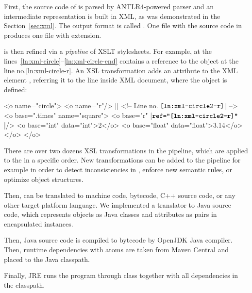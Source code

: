 First, the source code of \eo{} is parsed by ANTLR4-powered
parser and an intermediate representation is built in XML,
as was demonstrated in the Section~\ref{sec:xml}.
The output format is called \XMIR{}.
One  file with
the source code in \eo{} produces one \XMIR{} file with  extension.

\XMIR{} is then refined via a \emph{pipeline} of XSLT stylesheets.
For example, \XMIR{} at the
lines~\ref{ln:xml-circle}--\ref{ln:xml-circle-end} contains a
reference to the object  at the line no.\ref{ln:xml-circle-r}.
An XSL transformation adds an attribute  to the XML element ,
referring it to the line inside XML document, where the object  is defined:

\begin{ffcode}
<o name="circle">
  <o name="r"/> |$\label{ln:xml-circle2-r}$| <!-- Line no.|$\texttt{\ref{ln:xml-circle2-r}}$| -->
  <o base=".times" name="square">
    <o base="r" |$\textbf{\texttt{ref="\ref{ln:xml-circle2-r}"}}$|/>
    <o base="int" data="int">2</o>
    <o base="float" data="float">3.14</o>
  </o>
</o>
\end{ffcode}

There are over two dozens XSL transformations in the pipeline, which
are applied to the \XMIR{} in a specific order. New transformations can
be added to the pipeline for example in order to detect inconsistencies
in \XMIR{}, enforce new semantic rules, or optimize object structures.

Then, \XMIR{} can be translated to machine code, bytecode, C++ source code,
or any other target platform language. We implemented
a translator to Java source code, which represents
\XMIR{} objects as Java classes and attributes as pairs in encapsulated
 instances.

Then, Java source code is compiled to bytecode by OpenJDK Java compiler.
Then, runtime dependencies with atoms are taken from Maven Central
and placed to the Java classpath.

Finally, JRE runs the program through  class together with
all  dependencies in the classpath.

